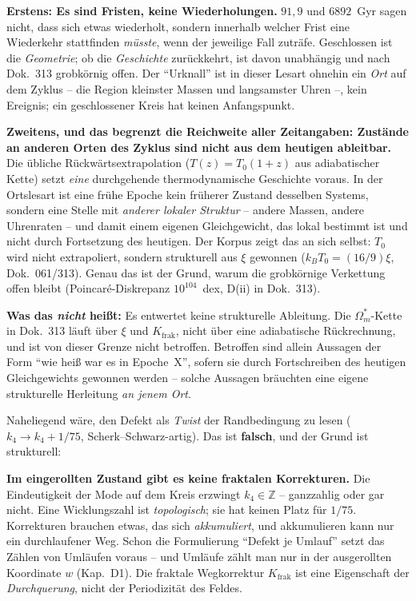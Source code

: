 \textbf{Erstens: Es sind Fristen, keine Wiederholungen.} $91{,}9$
und $6892$~Gyr sagen nicht, dass sich etwas wiederholt, sondern
innerhalb welcher Frist eine Wiederkehr stattfinden \emph{müsste},
wenn der jeweilige Fall zuträfe. Geschlossen ist die
\emph{Geometrie}; ob die \emph{Geschichte} zurückkehrt, ist davon
unabhängig und nach Dok.~313 grobkörnig offen. Der
\enquote{Urknall} ist in dieser Lesart ohnehin ein \emph{Ort} auf
dem Zyklus -- die Region kleinster Massen und langsamster Uhren
--, kein Ereignis; ein geschlossener Kreis hat keinen
Anfangspunkt.

\textbf{Zweitens, und das begrenzt die Reichweite aller
Zeitangaben: Zustände an anderen Orten des Zyklus sind nicht aus
dem heutigen ableitbar.} Die übliche Rückwärtsextrapolation
($T(z) = T_0(1+z)$ aus adiabatischer Kette) setzt \emph{eine}
durchgehende thermodynamische Geschichte voraus. In der
Ortslesart ist eine frühe Epoche kein früherer Zustand desselben
Systems, sondern eine Stelle mit \emph{anderer lokaler Struktur}
-- andere Massen, andere Uhrenraten -- und damit einem eigenen
Gleichgewicht, das lokal bestimmt ist und nicht durch Fortsetzung
des heutigen. Der Korpus zeigt das an sich selbst: $T_0$ wird
nicht extrapoliert, sondern strukturell aus $\xi$ gewonnen
($k_BT_0 = (16/9)\xi$, Dok.~061/313). Genau das ist der Grund,
warum die grobkörnige Verkettung offen bleibt (Poincaré-Diskrepanz
$10^{104}$~dex, D(ii) in Dok.~313).

\noindent \textbf{Was das \emph{nicht} heißt:} Es entwertet keine
strukturelle Ableitung. Die $\Omega_m^{*}$-Kette in Dok.~313 läuft
über $\xi$ und $K_\text{frak}$, nicht über eine adiabatische
Rückrechnung, und ist von dieser Grenze nicht betroffen. Betroffen
sind allein Aussagen der Form \enquote{wie heiß war es in
Epoche~X}, sofern sie durch Fortschreiben des heutigen
Gleichgewichts gewonnen werden -- solche Aussagen bräuchten eine
eigene strukturelle Herleitung \emph{an jenem Ort}.

Naheliegend wäre, den Defekt als \emph{Twist} der Randbedingung
zu lesen ($k_4 \to k_4 + 1/75$, Scherk--Schwarz-artig). Das ist
\textbf{falsch}, und der Grund ist strukturell:

\textbf{Im eingerollten Zustand gibt es keine fraktalen
Korrekturen.} Die Eindeutigkeit der Mode auf dem Kreis erzwingt
$k_4 \in \mathbb{Z}$ -- ganzzahlig oder gar nicht. Eine
Wicklungszahl ist \emph{topologisch}; sie hat keinen Platz für
$1/75$. Korrekturen brauchen etwas, das sich \emph{akkumuliert},
und akkumulieren kann nur ein durchlaufener Weg. Schon die
Formulierung \enquote{Defekt je Umlauf} setzt das Zählen von
Umläufen voraus -- und Umläufe zählt man nur in der ausgerollten
Koordinate $w$ (Kap.~D1). Die fraktale Wegkorrektur
$K_\text{frak}$ ist eine Eigenschaft der \emph{Durchquerung},
nicht der Periodizität des Feldes.

